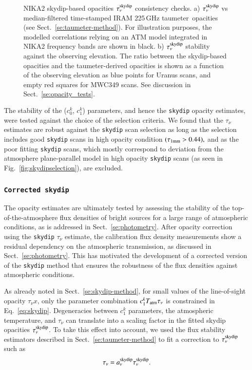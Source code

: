 \documentclass[traditionalabstract]{aa}
\newcommand{\taunu}{\tau_{\nu}}
\newcommand{\taumeter}{taumeter}
\newcommand{\lp}[1]{#1}
\begin{document}
{\begin{figure}[!thbp]
\begin{center}
   \caption[]{NIKA2
     skydip-based opacities $\taunu^{\rm{skydip}}$ consistency checks.
     a) $\taunu^{\rm{skydip}}$ vs median-filtered
    time-stamped IRAM 225\,GHz \taumeter\ opacities (see
    Sect.~\ref{se:taumeter-method}).
    For illustration purposes, the modelled correlations relying on an ATM model integrated in
    NIKA2 frequency bands are shown in black. b) $\taunu^{\rm{skydip}}$ stability against the observing
    elevation. The ratio between the skydip-based opacities and the
    \taumeter-derived opacities is shown as a function of the observing
    elevation as blue points for Uranus scans, and empty red squares for
    MWC349 scans. See discussion in Sect.~\ref{se:opacity_tests}. } 
\label{fig:skydip-to-taumeter-correl}
\end{center}
\end{figure}
%
The stability of the ($c_0^k$, $c_1^k$) parameters, and hence the
{\tt skydip} opacity estimates, were tested against the
choice of the selection criteria. We found that the $\taunu$
estimates are robust against the {\tt skydip} scan selection as long as the
selection includes good {\tt skydip} scans in high opacity condition
$(\tau_{1\rm{mm}} > 0.44),$ and as the poor
fitting {\tt skydip} scans, which mostly correspond to deviation from the
atmosphere plane-parallel model in high opacity {\tt skydip} scans (as seen in
Fig.~\ref{fig:skydipselection}), are excluded.

\subsubsection{{\tt Corrected skydip}}
\label{se:corrected-skydip}
The opacity estimates are ultimately tested by assessing the
stability of the top-of-the-atmosphere flux densities of bright sources for a large
range of atmospheric conditions, as is addressed in
Sect.~\ref{se:photometry}. After opacity correction using the
{\tt skydip} $\taunu$ estimate, the calibration flux density
measurements show a residual dependency on the atmospheric
transmission, as discussed in Sect.~\ref{se:photometry}. This has
motivated the development of a corrected version of the {\tt skydip}
method that ensures the robustness of the flux densities against
atmospheric conditions.

{\lp As already noted in Sect.~\ref{se:skydip-method}, for small values of the
line-of-sight opacity $\taunu x$, only the parameter combination
$c_1^k T_{\rm{atm}}\taunu$ is constrained in
Eq.~\ref{eq:skydip}. Degeneracies between $c_1^k$ parameters, the
atmospheric temperature, and $\taunu$ can translate into a
scaling factor in the fitted skydip opacities
$\taunu^{\rm{skydip}}$. To take this effect into account, }  
we used the flux stability estimators described in
Sect.~\ref{se:taumeter-method} to fit a correction to $\taunu^{\rm{skydip}}$ such as
\begin{equation}  
  \taunu =  a_\nu^{\rm{skydip}}\taunu^{\rm{skydip}}.
  \label{eq:corrected_skydip}
\end{equation}

}
\end{document}
